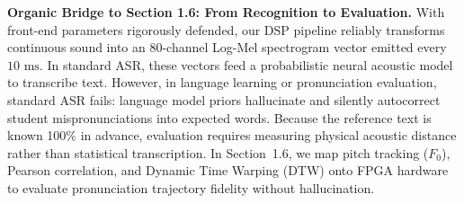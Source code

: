 \documentclass[11pt,a4paper]{article}
\begin{document}
\textbf{Organic Bridge to Section 1.6: From Recognition to Evaluation.} With front-end parameters rigorously defended, our DSP pipeline reliably transforms continuous sound into an 80-channel Log-Mel spectrogram vector emitted every $10\text{ ms}$. In standard ASR, these vectors feed a probabilistic neural acoustic model to transcribe text. However, in language learning or pronunciation evaluation, standard ASR fails: language model priors hallucinate and silently autocorrect student mispronunciations into expected words. Because the reference text is known 100\% in advance, evaluation requires measuring physical acoustic distance rather than statistical transcription. In Section~1.6, we map pitch tracking ($F_0$), Pearson correlation, and Dynamic Time Warping (DTW) onto FPGA hardware to evaluate pronunciation trajectory fidelity without hallucination.
\end{document}
